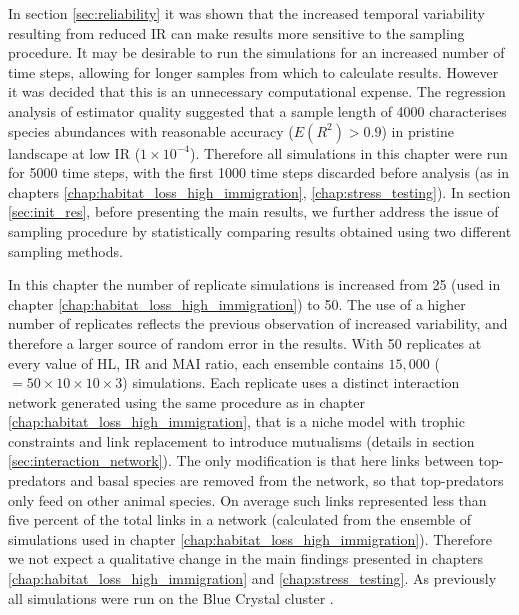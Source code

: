 In section \ref{sec:reliability} it was shown that the increased temporal variability resulting from reduced IR can make results more sensitive to the sampling procedure. It may be desirable to run the simulations for an increased number of time steps, allowing for longer samples from which to calculate results. However it was decided that this is an unnecessary computational expense. The regression analysis of estimator quality suggested that a sample length of 4000 characterises species abundances with reasonable accuracy ($E(R^2) > 0.9$) in pristine landscape at low IR ($1 \times 10^{-4}$). Therefore all simulations in this chapter were run for 5000 time steps, with the first 1000 time steps discarded before analysis (as in chapters \ref{chap:habitat_loss_high_immigration}, \ref{chap:stress_testing}). In section \ref{sec:init_res}, before presenting the main results, we further address the issue of sampling procedure by statistically comparing results obtained using two different sampling methods. 

In this chapter the number of replicate simulations is increased from 25 (used in chapter \ref{chap:habitat_loss_high_immigration}) to 50. The use of a higher number of replicates reflects the previous observation of increased variability, and therefore a larger source of random error in the results. With 50 replicates at every value of HL, IR and MAI ratio, each ensemble contains $15,000$ ($= 50 \times 10 \times 10 \times 3$) simulations. Each replicate uses a distinct interaction network generated using the same procedure as in chapter \ref{chap:habitat_loss_high_immigration}, that is a niche model with trophic constraints and link replacement to introduce mutualisms (details in section \ref{sec:interaction_network}). The only modification is that here links between top-predators and basal species are removed from the network, so that top-predators only feed on other animal species. On average such links represented less than five percent of the total links in a network (calculated from the ensemble of simulations used in chapter \ref{chap:habitat_loss_high_immigration}). Therefore we not expect a qualitative change in the main findings presented in chapters \ref{chap:habitat_loss_high_immigration} and \ref{chap:stress_testing}. As previously all simulations were run on the Blue Crystal cluster \cite{BC3}.

